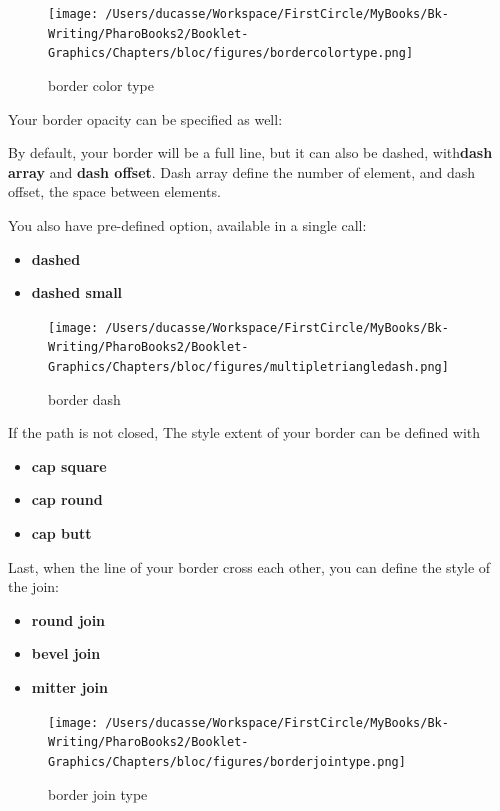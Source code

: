 \documentclass[10pt,twoside,english]{_support/latex/sbabook/sbabook}
\begin{document}
\begin{figure}[htpb]
\begin{center}
\texttt{[image: /Users/ducasse/Workspace/FirstCircle/MyBooks/Bk-Writing/PharoBooks2/Booklet-Graphics/Chapters/bloc/figures/bordercolortype.png]}
\caption{border color type}
\end{center}
\end{figure}


Your border opacity can be specified as well: 

By default, your border will be a full line, but it can also be dashed, with\textbf{dash array} and \textbf{dash offset}. Dash array define the number of element, and
dash offset, the space between elements.

You also have pre-defined option, available in a single call:

\begin{itemize}
    \item \textbf{dashed}
    \item \textbf{dashed small}
\end{itemize}

\begin{figure}[htpb]
\begin{center}
\texttt{[image: /Users/ducasse/Workspace/FirstCircle/MyBooks/Bk-Writing/PharoBooks2/Booklet-Graphics/Chapters/bloc/figures/multipletriangledash.png]}
\caption{border dash}
\end{center}
\end{figure}


If the path is not closed, The style extent of your border can be defined with

\begin{itemize}
    \item \textbf{cap square}
    \item \textbf{cap round}
    \item \textbf{cap butt}
\end{itemize}

Last, when the line of your border cross each other, you can define the style of
the join:

\begin{itemize}
    \item \textbf{round join}
    \item \textbf{bevel join}
    \item \textbf{mitter join}
\end{itemize}

\begin{figure}[htpb]
\begin{center}
\texttt{[image: /Users/ducasse/Workspace/FirstCircle/MyBooks/Bk-Writing/PharoBooks2/Booklet-Graphics/Chapters/bloc/figures/borderjointype.png]}
\caption{border join type}
\end{center}
\end{figure}
\end{document}
